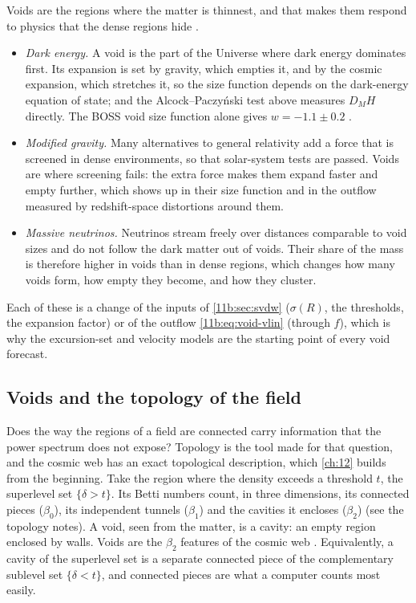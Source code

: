 Voids are the regions where the matter is thinnest, and that makes them respond to
physics that the dense regions hide .
\begin{itemize}[itemsep=2pt]
  \item \emph{Dark energy.} A void is the part of the Universe where dark energy
        dominates first. Its expansion is set by gravity, which empties it, and by
        the cosmic expansion, which stretches it, so the size function depends on
        the dark-energy equation of state; and the Alcock--Paczy\'nski test above
        measures $D_MH$ directly. The BOSS void size function alone gives
        $w=-1.1\pm0.2$ \cite{Contarini2023}.
  \item \emph{Modified gravity.} Many alternatives to general relativity add a
        force that is screened in dense environments, so that solar-system tests
        are passed. Voids are where screening fails: the extra force makes them
        expand faster and empty further, which shows up in their size function and
        in the outflow measured by redshift-space distortions around them.
  \item \emph{Massive neutrinos.} Neutrinos stream freely over distances comparable
        to void sizes and do not follow the dark matter out of voids. Their share
        of the mass is therefore higher in voids than in dense regions, which
        changes how many voids form, how empty they become, and how they cluster.
\end{itemize}
Each of these is a change of the inputs of \cref{11b:sec:svdw} ($\sigma(R)$, the
thresholds, the expansion factor) or of the outflow \eqref{11b:eq:void-vlin}
(through $f$), which is why the excursion-set and velocity models are the
starting point of every void forecast.

\subsection{Voids and the topology of the field}
\label{11b:sec:void-topology}

Does the way the regions of a field are connected carry information that the
power spectrum does not expose? Topology is the tool made for that question, and
the cosmic web has an exact topological description, which \cref{ch:12} builds
from the beginning. Take the region where the density exceeds a threshold $t$, the
superlevel set $\{\delta>t\}$. Its Betti numbers count, in three dimensions, its
connected pieces ($\beta_0$), its independent tunnels ($\beta_1$) and the cavities
it encloses ($\beta_2$) (see the topology notes). A void, seen from the matter, is a
cavity: an empty region enclosed by walls. Voids are the $\beta_2$ features of the
cosmic web \cite{Pranav2017,Wilding2021}. Equivalently, a cavity of the superlevel
set is a separate connected piece of the complementary sublevel set
$\{\delta<t\}$, and connected pieces are what a computer counts most easily.

